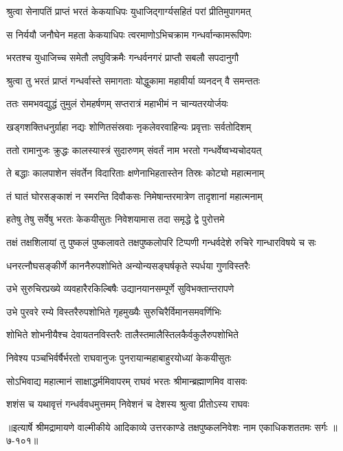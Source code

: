 
\twolineshloka
{श्रुत्वा सेनापतिं प्राप्तं भरतं केकयाधिपः}
{युधाजिद्गार्ग्यसहितं परां प्रीतिमुपागमत्} %

\twolineshloka
{स निर्ययौ जनौघेन महता केकयाधिपः}
{त्वरमाणोऽभिचक्राम गन्धर्वान्कामरूपिणः} %

\twolineshloka
{भरतश्च युधाजिच्च समेतौ लघुविक्रमैः}
{गन्धर्वनगरं प्राप्तौ सबलौ सपदानुगौ} %

\twolineshloka
{श्रुत्वा तु भरतं प्राप्तं गन्धर्वास्ते समागताः}
{योद्धुकामा महावीर्या व्यनदन् वै समन्ततः} %

\twolineshloka
{ततः समभवद्युद्धं तुमुलं रोमहर्षणम्}
{सप्तरात्रं महाभीमं न चान्यतरयोर्जयः} %

\twolineshloka
{खड्गशक्तिधनुर्ग्राहा नद्यः शोणितसंस्रवाः}
{नृकलेवरवाहिन्यः प्रवृत्ताः सर्वतोदिशम्} %

\twolineshloka
{ततो रामानुजः क्रुद्धः कालस्यास्त्रं सुदारुणम्}
{संवर्तं नाम भरतो गन्धर्वेष्वभ्यचोदयत्} %

\twolineshloka
{ते बद्धाः कालपाशेन संवर्तेन विदारिताः}
{क्षणेनाभिहतास्तेन तिस्रः कोट्यो महात्मनाम्} %

\twolineshloka
{तं घातं घोरसङ्काशं न स्मरन्ति दिवौकसः}
{निमेषान्तरमात्रेण तादृशानां महात्मनाम्} %

\twolineshloka
{हतेषु तेषु सर्वेषु भरतः केकयीसुतः}
{निवेशयामास तदा समृद्धे द्वे पुरोत्तमे} %

\twolineshloka
{तक्षं तक्षशिलायां तु पुष्कलं पुष्कलावते}
{तक्षपुष्कलोपरि टिप्पणी गन्धर्वदेशे रुचिरे गान्धारविषये च सः} %

\twolineshloka
{धनरत्नौघसङ्कीर्णे काननैरुपशोभिते}
{अन्योन्यसङ्घर्षकृते स्पर्धया गुणविस्तरैः} %

\twolineshloka
{उभे सुरुचिरप्रख्ये व्यवहारैरकिल्बिषैः}
{उद्यानयानसम्पूर्णे सुविभक्तान्तरापणे} %

\twolineshloka
{उभे पुरवरे रम्ये विस्तरैरुपशोभिते}
{गृहमुख्यैः सुरुचिरैर्विमानसमवर्णिभिः} %

\twolineshloka
{शोभिते शोभनीयैश्च देवायतनविस्तरैः}
{तालैस्तमालैस्तिलकैर्वकुलैरुपशोभिते} %

\twolineshloka
{निवेश्य पञ्चभिर्वर्षैर्भरतो राघवानुजः}
{पुनरायान्महाबाहुरयोध्यां केकयीसुतः} %

\twolineshloka
{सोऽभिवाद्य महात्मानं साक्षाद्धर्ममिवापरम्}
{राघवं भरतः श्रीमान्ब्रह्माणमिव वासवः} %

\twolineshloka
{शशंस च यथावृत्तं गन्धर्ववधमुत्तमम्}
{निवेशनं च देशस्य श्रुत्वा प्रीतोऽस्य राघवः} %


॥इत्यार्षे श्रीमद्रामायणे वाल्मीकीये आदिकाव्ये उत्तरकाण्डे तक्षपुष्कलनिवेशः नाम एकाधिकशततमः सर्गः ॥७-१०१॥

